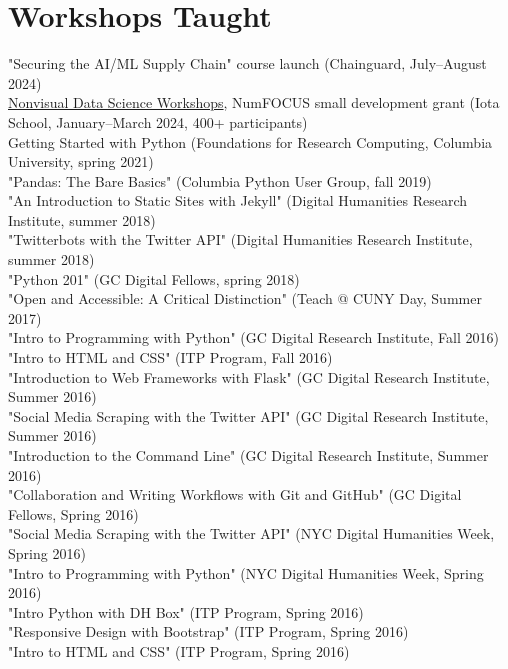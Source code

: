 \documentclass[11pt]{article}
\begin{document}
\section*{Workshops Taught}
\label{sec:org5a29ceb}
"Securing the AI/ML Supply Chain" course launch (Chainguard, July–August 2024)\\[0pt]
\href{https://iota-school.github.io/nonvisual\_data\_science\_workshops/}{Nonvisual Data Science Workshops}, NumFOCUS small development grant (Iota School, January–March 2024, 400+ participants)\\[0pt]
Getting Started with Python (Foundations for Research Computing, Columbia University, spring 2021)\\[0pt]
"Pandas: The Bare Basics" (Columbia Python User Group, fall 2019)\\[0pt]
"An Introduction to Static Sites with Jekyll" (Digital Humanities Research Institute, summer 2018)\\[0pt]
"Twitterbots with the Twitter API" (Digital Humanities Research Institute, summer 2018)\\[0pt]
"Python 201" (GC Digital Fellows, spring 2018)\\[0pt]
"Open and Accessible: A Critical Distinction" (Teach @ CUNY Day, Summer 2017)\\[0pt]
"Intro to Programming with Python" (GC Digital Research Institute, Fall 2016)\\[0pt]
"Intro to HTML and CSS" (ITP Program, Fall 2016)\\[0pt]
"Introduction to Web Frameworks with Flask" (GC Digital Research Institute, Summer 2016)\\[0pt]
"Social Media Scraping with the Twitter API" (GC Digital Research Institute, Summer 2016)\\[0pt]
"Introduction to the Command Line" (GC Digital Research Institute, Summer 2016)\\[0pt]
"Collaboration and Writing Workflows with Git and GitHub" (GC Digital Fellows, Spring 2016)\\[0pt]
"Social Media Scraping with the Twitter API" (NYC Digital Humanities Week, Spring 2016)\\[0pt]
"Intro to Programming with Python" (NYC Digital Humanities Week, Spring 2016)\\[0pt]
"Intro Python with DH Box" (ITP Program, Spring 2016)\\[0pt]
"Responsive Design with Bootstrap" (ITP Program, Spring 2016)\\[0pt]
"Intro to HTML and CSS" (ITP Program, Spring 2016)\\[0pt]
\end{document}
